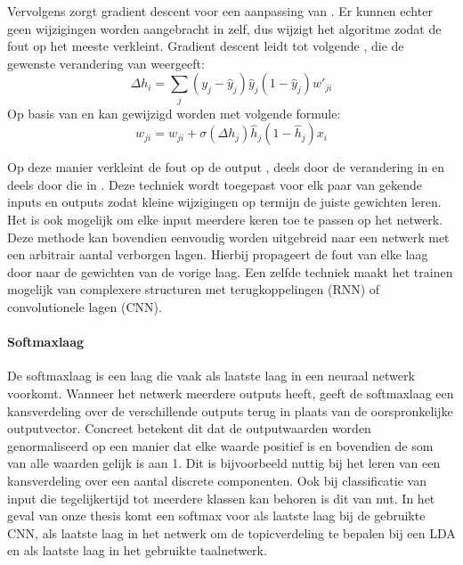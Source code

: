 Vervolgens zorgt gradient descent voor een aanpassing van . Er kunnen echter geen wijzigingen worden aangebracht in  zelf, dus wijzigt het algoritme  zodat de fout op  het meeste verkleint. Gradient descent leidt tot volgende , die de gewenste verandering van  weergeeft:
\begin{equation}
    \Delta h_i = \sum\limits_{j}(y_j-\hat{y}_j)\hat{y}_j(1-\hat{y}_j)w'_{ji}
\end{equation}
Op basis van  en  kan  gewijzigd worden met volgende formule:
\begin{equation}
    w_{ji} = w_{ji} + \sigma(\Delta h_j)\hat{h}_j(1-\hat{h}_j)x_i
\end{equation}


Op deze manier verkleint de fout op de output , deels door de verandering in  en deels door die in .
Deze techniek wordt toegepast voor elk paar van gekende inputs en outputs zodat kleine wijzigingen op termijn de juiste gewichten leren. Het is ook mogelijk om elke input meerdere keren toe te passen op het netwerk. Deze methode kan bovendien eenvoudig worden uitgebreid naar een netwerk met een arbitrair aantal verborgen lagen. Hierbij propageert de fout van elke laag door naar de gewichten van de vorige laag. Een zelfde techniek maakt het trainen mogelijk van complexere structuren met terugkoppelingen (RNN) of convolutionele lagen (CNN).

\paragraph{Softmaxlaag}\label{par:softmax}
De softmaxlaag is een laag die vaak als laatste laag in een neuraal netwerk voorkomt. Wanneer het netwerk meerdere outputs heeft, geeft de softmaxlaag een kansverdeling over de verschillende outputs terug in plaats van de oorspronkelijke outputvector. Concreet betekent dit dat de outputwaarden worden genormaliseerd op een manier dat elke waarde positief is en bovendien de som van alle waarden gelijk is aan 1. Dit is bijvoorbeeld nuttig bij het leren van een kansverdeling over een aantal discrete componenten. Ook bij classificatie van input die tegelijkertijd tot meerdere klassen kan behoren is dit van nut.
In het geval van onze thesis komt een softmax voor als laatste laag bij de gebruikte CNN, als laatste laag in het netwerk om de topicverdeling te bepalen bij een LDA en als laatste laag in het gebruikte taalnetwerk. 

